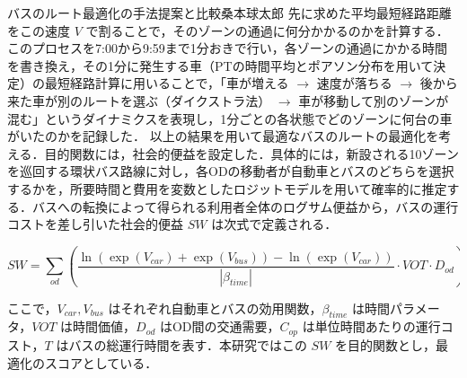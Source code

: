 \begin{column}{バスのルート最適化の手法提案と比較}{桑本球太郎}
先に求めた平均最短経路距離をこの速度 $V$ で割ることで，そのゾーンの通過に何分かかるのかを計算する．このプロセスを7:00から9:59まで1分おきで行い，各ゾーンの通過にかかる時間を書き換え，その1分に発生する車（PTの時間平均とポアソン分布を用いて決定）の最短経路計算に用いることで，「車が増える $\to$ 速度が落ちる $\to$ 後から来た車が別のルートを選ぶ（ダイクストラ法） $\to$ 車が移動して別のゾーンが混む」というダイナミクスを表現し，1分ごとの各状態でどのゾーンに何台の車がいたのかを記録した．
以上の結果を用いて最適なバスのルートの最適化を考える．目的関数には，社会的便益を設定した．具体的には，新設される10ゾーンを巡回する環状バス路線に対し，各ODの移動者が自動車とバスのどちらを選択するかを，所要時間と費用を変数としたロジットモデルを用いて確率的に推定する．バスへの転換によって得られる利用者全体のログサム便益から，バスの運行コストを差し引いた社会的便益 $SW$ は次式で定義される．

\begin{equation}
  SW = \sum_{od} \left( \frac{\ln(\exp(V_{car}) + \exp(V_{bus})) - \ln(\exp(V_{car}))}{|\beta_{time}|} \cdot VOT \cdot D_{od} \right) - C_{op} \cdot T .
  \label{eq:social_welfare}
\end{equation}

ここで，$V_{car}, V_{bus}$ はそれぞれ自動車とバスの効用関数，$\beta_{time}$ は時間パラメータ，$VOT$ は時間価値，$D_{od}$ はOD間の交通需要，$C_{op}$ は単位時間あたりの運行コスト，$T$ はバスの総運行時間を表す．本研究ではこの $SW$ を目的関数とし，最適化のスコアとしている．


\end{column}
